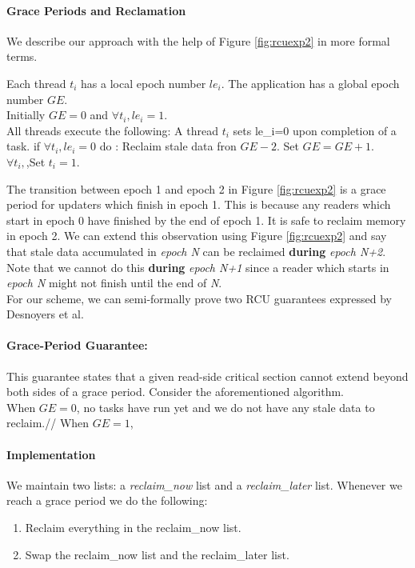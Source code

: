 \documentclass[a4paper,marginparwidth=50pt,marginparsep=10pt]{article}
\begin{document}
\paragraph{Grace Periods and Reclamation}
We describe our approach with the help of Figure \ref{fig:rcuexp2} in more formal terms.\\
\begin{algorithmic}
Each thread $t_i$ has a local epoch number $le_i$.
The application has a global epoch number $GE$.\\
Initially  $GE=0$ and $\forall t_i, le_i=1$. \\

All threads execute the following:
A thread $t_i$ sets le_i=0 upon completion of a task.
if $\forall t_i, le_i=0$
do : 
Reclaim stale data fron $GE-2$.
Set $GE=GE+1$.\\
$\forall t_i,$,Set $t_i=1$.\\
\end{algorithmic}
The transition between epoch 1 and epoch 2 in Figure \ref{fig:rcuexp2} is a grace period for updaters which finish in epoch 1. This is because any readers which start in epoch 0 have finished by the end of epoch 1. It is safe to reclaim memory in epoch 2. We can extend this observation using Figure \ref{fig:rcuexp2} and say that stale data accumulated in \emph{epoch N} can be reclaimed \textbf{during} \emph{epoch N+2}. Note that we cannot do this \textbf{during} \emph{epoch N+1} since a reader which starts in \emph{epoch N} might not finish until the end of \emph{N}. 
\\For our scheme, we can semi-formally prove two RCU guarantees expressed by Desnoyers et al\cite{urcu}.
\paragraph{Grace-Period Guarantee:} This guarantee states that a given read-side critical section cannot extend beyond both sides of a grace period. Consider the aforementioned algorithm.\\
When $GE=0$, no tasks have run yet and we do not have any stale data to reclaim.//
When $GE=1$, 

\paragraph{Implementation}
 We maintain two lists: a \emph{reclaim\_now} list and a \emph{reclaim\_later} list. Whenever we reach a grace period we do the following:
\begin{enumerate}
\item Reclaim everything in the reclaim\_now list.
\item Swap the reclaim\_now list and the reclaim\_later list.
\end{enumerate}
\end{document}
